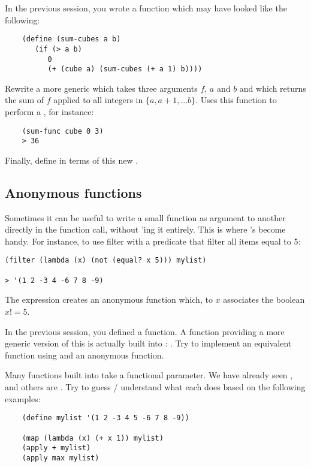 \documentclass{../../../tp}
\begin{document}
\begin{instruction}
	In the previous session, you wrote a  function which may have looked like the following: 
	
	\begin{verbatim}
	(define (sum-cubes a b)
	   (if (> a b)
	      0
	      (+ (cube a) (sum-cubes (+ a 1) b))))
	\end{verbatim}
	
	Rewrite a more generic  which takes three arguments $f$, $a$ and $b$ and which returns the sum of $f$ applied to all integers in $\{a, a+1, ... b\}$. Uses this function to perform a , for instance:
	\begin{verbatim}
	(sum-func cube 0 3)
	> 36
	\end{verbatim}
	
	Finally, define  in terms of this new .
\end{instruction}


\subsection{Anonymous functions}

Sometimes it can be useful to write a small function as argument to another directly in the function call, without 'ing it entirely. This is where 's become handy. For instance, to use filter with a predicate that filter all items equal to 5:

\begin{verbatim}
(filter (lambda (x) (not (equal? x 5))) mylist)

> '(1 2 -3 4 -6 7 8 -9)
\end{verbatim}

The   expression creates an anonymous function which, to $x$ associates the boolean $x != 5$. 

\begin{instruction}
	In the previous session, you defined a  function. A function providing a more generic version of this is actually built into \scheme: . Try to implement an equivalent  function using   and an anonymous function.
\end{instruction}

\begin{instruction}
	Many functions built into \scheme take a functional parameter. We have already seen , and others are . 
	Try to guess / understand what each does based on the following examples:
	
	\begin{verbatim}
	(define mylist '(1 2 -3 4 5 -6 7 8 -9))
	
	(map (lambda (x) (+ x 1)) mylist)
	(apply + mylist)
	(apply max mylist)
	\end{verbatim}

\end{instruction}
\end{document}
